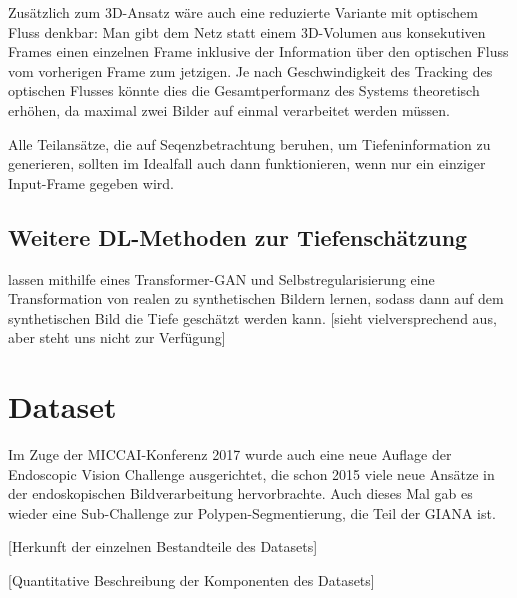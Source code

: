 Zusätzlich zum 3D-Ansatz wäre auch eine reduzierte Variante mit optischem Fluss denkbar:
Man gibt dem Netz statt einem 3D-Volumen aus konsekutiven Frames einen einzelnen Frame inklusive der Information über den optischen Fluss vom vorherigen Frame zum jetzigen.
Je nach Geschwindigkeit des Tracking des optischen Flusses könnte dies die Gesamtperformanz des Systems theoretisch erhöhen, da maximal zwei Bilder auf einmal verarbeitet werden müssen.

Alle Teilansätze, die auf Seqenzbetrachtung beruhen, um Tiefeninformation zu generieren, sollten im Idealfall auch dann funktionieren, wenn nur ein einziger Input-Frame gegeben wird.

\subsection{Weitere DL-Methoden zur Tiefenschätzung}

\citeauthor{Mahmood.20171129} lassen mithilfe eines Transformer-GAN und Selbstregularisierung eine Transformation von realen zu synthetischen Bildern lernen, sodass dann auf dem synthetischen Bild die Tiefe geschätzt werden kann.
[sieht vielversprechend aus, aber steht uns nicht zur Verfügung]

\section{Dataset}

Im Zuge der MICCAI-Konferenz 2017 wurde auch eine neue Auflage der Endoscopic Vision Challenge ausgerichtet, die schon 2015 viele neue Ansätze in der endoskopischen Bildverarbeitung hervorbrachte.
Auch dieses Mal gab es wieder eine Sub-Challenge zur Polypen-Segmentierung, die Teil der GIANA ist.

[Herkunft der einzelnen Bestandteile des Datasets]

[Quantitative Beschreibung der Komponenten des Datasets]
